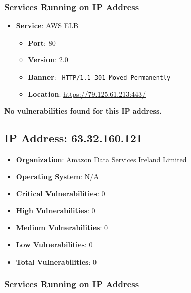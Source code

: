 \documentclass{article}
\begin{document}
\subsubsection*{Services Running on IP Address}

\begin{itemize}
    
        \item \textbf{Service}: AWS ELB
        \begin{itemize}
            \item \textbf{Port}: 80
            \item \textbf{Version}:  2.0 
            \item \textbf{Banner}: \texttt{
                HTTP/1.1 301 Moved Permanently
            }
            \item \textbf{Location}: \href{ https://79.125.61.213:443/ }{ https://79.125.61.213:443/ }
        \end{itemize}
    
\end{itemize}


\textbf{No vulnerabilities found for this IP address.}




\clearpage



\subsection*{IP Address: 63.32.160.121}

\begin{itemize}
    \item \textbf{Organization}: Amazon Data Services Ireland Limited
    \item \textbf{Operating System}:  N/A 
    \item \textbf{Critical Vulnerabilities}: 0
    \item \textbf{High Vulnerabilities}: 0
    \item \textbf{Medium Vulnerabilities}: 0
    \item \textbf{Low Vulnerabilities}: 0
    \item \textbf{Total Vulnerabilities}: 0
\end{itemize}

\subsubsection*{Services Running on IP Address}
\end{document}
